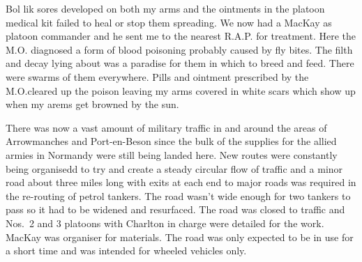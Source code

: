 Bol lik sores developed on both my arms and the ointments in the
platoon medical kit failed to heal or stop them spreading. We now had
a \lieutenant MacKay as platoon commander and he sent me to the nearest
R.A.P. for treatment. Here the M.O. diagnosed a form of blood
poisoning probably caused by fly bites. The filth and decay lying
about was a paradise for them in which to breed and feed. There were
swarms of them everywhere. Pills and ointment prescribed by the
M.O.cleared up the poison leaving my arms covered in white scars which
show up when my arems get browned by the sun.

There was now a vast amount of military traffic in and around the
areas of Arrowmanches and Port-en-Beson since the bulk of the supplies
for the allied armies in Normandy were still being landed here. New
routes were constantly being organisedd to try and create a steady
circular flow of traffic and a minor road about three miles long with
exits at each end to major roads was required in the re-routing of
petrol tankers. The road wasn't wide enough for two tankers to pass so
it had to be widened and resurfaced. The road was closed to traffic
and Nos.~2 and 3 platoons with \lieutenant Charlton in charge were detailed
for the work. \Lieutenant MacKay was organiser for materials. The road was
only expected to be in use for a short time and was intended for
wheeled vehicles only.

